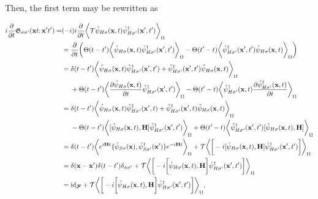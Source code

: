 Then, the first term may be rewritten as 
    
    \begin{equation}
        \begin{split}
            i\frac{\partial}{\partial t} \mathfrak{G}_{\sigma \sigma'}({\bf x} t; {\bf x}' t') = &(-i) i \frac{\partial}{\partial t} \bigg\langle \mathcal{T} \hat{\psi}_{H \sigma}({\bf x}, t) \hat{\psi}^\dagger_{H \sigma'}({\bf x}', t') \bigg \rangle_{\Omega}\\
            &= \frac{\partial}{\partial t} \bigg(\Theta(t-t')\bigg\langle \hat{\psi}_{H \sigma}({\bf x}, t) \hat{\psi}^\dagger_{H \sigma'}({\bf x}', t') \bigg \rangle_{\Omega} -\Theta(t'-t) \bigg\langle\hat{\psi}^\dagger_{H \sigma'}({\bf x}', t')\hat{\psi}_{H \sigma}({\bf x}, t)  \bigg \rangle_{\Omega}  \bigg)\\
            &= \delta(t-t')\bigg\langle \hat{\psi}_{H \sigma}({\bf x}, t) \hat{\psi}^\dagger_{H \sigma'}({\bf x}', t') +  \hat{\psi}^\dagger_{H \sigma'}({\bf x}', t')\hat{\psi}_{H \sigma}({\bf x}, t) \bigg \rangle_{\Omega} \\
            & \textnormal{ } \textnormal{ } \textnormal{ } \textnormal{ }+ \Theta(t-t') \bigg\langle \frac{\partial\hat{\psi}_{H \sigma}({\bf x}, t)}{\partial t} \hat{\psi}^\dagger_{H \sigma'}({\bf x}', t') \bigg \rangle_{\Omega} - \Theta(t'-t) \bigg\langle \hat{\psi}^\dagger_{H \sigma'}({\bf x}, t)  \frac{\partial \hat{\psi}^\dagger_{H \sigma'}({\bf x}, t)}{\partial t} \bigg \rangle_{\Omega}\\
            &= \delta(t-t') \bigg\langle \hat{\psi}_{H \sigma}({\bf x}, t) \hat{\psi}^\dagger_{H \sigma'}({\bf x}', t) +  \hat{\psi}^\dagger_{H \sigma'}({\bf x}', t)\hat{\psi}_{H \sigma}({\bf x}, t) \bigg \rangle_{\Omega} \\
            & \textnormal{ } \textnormal{ } \textnormal{ } \textnormal{ }
            - \Theta(t-t') \bigg\langle [\hat{\psi}_{H \sigma}({\bf x}, t), {\bf H}] \hat{\psi}^\dagger_{H \sigma'}({\bf x}', t') \bigg \rangle_{\Omega} + \Theta(t'-t) \bigg\langle\hat{\psi}^\dagger_{H \sigma'}({\bf x}', t') [\hat{\psi}_{H \sigma}({\bf x}, t), {\bf H}] \bigg \rangle_{\Omega} \\
            &= \delta(t-t') \bigg\langle e^{i {\bf H} t} \{\hat{\psi}_{S \sigma}({\bf x}), \hat{\psi}^\dagger_{S \sigma'}({\bf x}')\} e^{-i {\bf H} t} \bigg \rangle_{\Omega} + \mathcal{T} \bigg\langle \bigg[-i [\hat{\psi}_{H \sigma}({\bf x}, t), {\bf H}] \hat{\psi}^\dagger_{H \sigma'}({\bf x}', t') \bigg] \bigg \rangle_{\Omega} \\
            &= \delta({\bf x} - {\bf x}') \delta(t-t') \delta_{\sigma \sigma'} + \mathcal{T} \bigg\langle \bigg[-i \bigg[\hat{\psi}_{H \sigma}({\bf x}, t), {\bf H}\bigg] \hat{\psi}^\dagger_{H \sigma'}({\bf x}', t') \bigg] \bigg \rangle_{\Omega} \\
            &= \textnormal{id}_{\bm{\mathcal{F}}} + \mathcal{T} \bigg\langle \bigg[-i \bigg[\hat{\psi}_{H \sigma}({\bf x}, t), {\bf H}\bigg] \hat{\psi}^\dagger_{H \sigma'}({\bf x}', t') \bigg] \bigg \rangle_{\Omega}, 
        \end{split}
    \end{equation}
    
